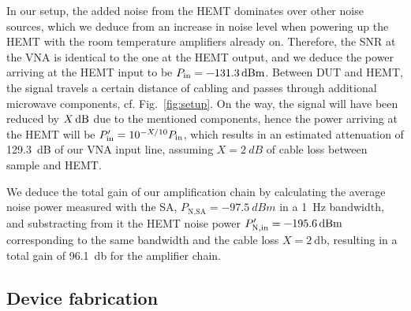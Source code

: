 In our setup, the added noise from the HEMT dominates over other noise sources, which we deduce from an increase in noise level when powering up the HEMT with the room temperature amplifiers already on.
% 
Therefore, the SNR at the VNA is identical to the one at the HEMT output, and we deduce the power arriving at the HEMT input to be $P_{\rm in}=\SI{-131.3}{dBm}$. 
% 
Between DUT and HEMT, the signal travels a certain distance of cabling and passes through additional microwave components, cf. Fig.~\ref{fig:setup}.
% 
On the way, the signal will have been reduced by $X {\,\rm dB}$ due to the mentioned components, hence the power arriving at the HEMT will be $P_{\rm in}' = 10^{-X/10} P_{\rm in}$, which results in an estimated attenuation of \SI{129.3}{dB} of our VNA input line, assuming $X=\SI{2}{dB}$ of cable loss between sample and HEMT.

We deduce the total gain of our amplification chain by calculating the average noise power measured with the SA, $P_\text{N,SA}=\SI{-97.5}{dBm}$ in a \SI{1}{\hertz} bandwidth, and substracting from it the HEMT noise power $P_{\rm N,in}'=\SI{-195.6}{dBm}$ corresponding to the same bandwidth and the cable loss $X=\SI{2}{\decibel}$, resulting in a total gain of \SI{96.1}{\decibel} for the amplifier chain.

\subsection{Device fabrication}\label{sec:fabrication}

